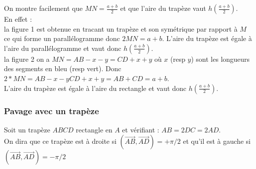 \documentclass[a4paper,11pt]{book}
\begin{document}
On montre facilement que
$\displaystyle MN=\frac{a+b}{2}$ et que 
l'aire du trap\`eze vaut 
$\displaystyle h(\frac{a+b}{2})$.\\
En effet :\\
la figure 1 est obtenue en tracant un trap\`eze et son sym\'etrique par rapport 
\`a $M$ ce qui forme un parall\'elogramme donc $2MN=a+b$. L'aire du trap\`eze 
est \'egale \`a l'aire du parall\'elogramme et vaut donc $\displaystyle h(\frac{a+b}{2})$.\\
la figure 2 on a $MN=AB-x-y=CD+x+y$ o\`u $x$ (resp $y$) sont les longueurs
 des segments en bleu (resp vert). Donc $2*MN=AB-x-yCD+x+y=AB+CD=a+b$.\\
L'aire du trap\`eze est \'egale \`a l'aire du rectangle et vaut donc
$\displaystyle h(\frac{a+b}{2})$.
\subsubsection{Pavage avec un trap\`eze}
Soit un trap\`eze $ABCD$ rectangle en $A$ et v\'erifiant :  $AB=2DC=2AD$.\\
On dira que ce trap\`eze est \`a droite si $(\overrightarrow{AB},\overrightarrow{AD})=+\pi/2$  et qu'il est \`a gauche si $(\overrightarrow{AB},\overrightarrow{AD})=-\pi/2$ 
\end{document}
